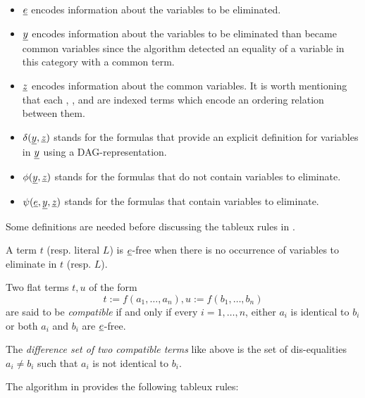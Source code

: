 \begin{itemize}
  \item $\underline{e}$ encodes information about 
    the variables to be eliminated.
  \item $\underline{y}$ encodes information about 
    the variables to be eliminated
    than became common variables since the 
    algorithm detected an equality
    of a variable in this category with a common term.
  \item $\underline{z}$ encodes information about the 
    common variables. It is worth
    mentioning that each , , and  
    are indexed terms
    which encode an ordering relation between them.
  \item $\delta(\underline{y}, \underline{z})$ stands for the formulas 
    that provide
    an explicit definition for variables in 
    $\underline{y}$ using a DAG-representation.
  \item $\phi(\underline{y}, \underline{z})$ stands for the formulas 
    that do not contain
    variables to eliminate.
  \item $\psi(\underline{e}, \underline{y}, \underline{z})$ stands 
    for the formulas
    that contain variables to eliminate.
\end{itemize}

Some definitions are needed before discussing 
the tableux rules in 
\cite{ghilardi2020compactly}.

\begin{definition}
  A term $t$ (resp. literal $L$) is $\underline{e}$-free 
  when there is no occurrence
  of variables to eliminate in $t$ (resp. $L$).

  Two flat terms $t, u$ of the form 
  \begin{equation*}
    t := f(a_1, \dots, a_n), u := f(b_1, \dots, b_n)
  \end{equation*}
  are said to be \emph{compatible} if and only if every $i = 1, \dots, n$, either
  $a_i$ is identical to $b_i$ or both $a_i$ and $b_i$ are $\underline{e}$-free.

  The \emph{difference set of two compatible terms} like 
  above is the
  set of dis-equalities $a_i \neq b_i$ such that 
  $a_i$ is not identical
  to $b_i$.
\end{definition}

The algorithm in \cite{ghilardi2020compactly} provides 
the following tableux rules:

